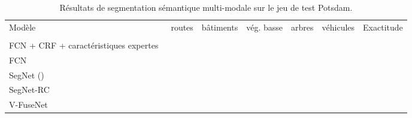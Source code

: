 \begin{table}
    \caption{Résultats de segmentation sémantique multi-modale sur le jeu de test  Potsdam.}
    \label{table:final_potsdam}
    \setlength\tabcolsep{4pt}
	\begin{tabularx}{\textwidth}{Y c c c c c c}
    \toprule
  	Modèle & routes & bâtiments & vég. basse & arbres & véhicules & Exactitude\\\\
    \midrule
    FCN + CRF + caractéristiques expertes~\cite{liu_dense_2017} &  &  &  &  &  & \\
    FCN~\cite{sherrah_fully_2016}                               &  &  &  &  &  & \\
    \midrule
    SegNet ()  &  &  &  &  &  & \\
	  SegNet-RC                  &  &  &  &  &  & \\
    V-FuseNet                  &  &  &  &  &  & \\
    \bottomrule
    \end{tabularx}
\end{table}



